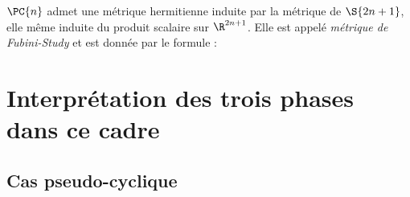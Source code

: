 \begin{proposition}
	$\PC{n}$ admet une métrique hermitienne induite par la métrique de $\S{2n+1}$, elle même induite du produit scalaire sur $\R^{2n+1}$. Elle est appelé \emph{métrique de Fubini-Study} et est donnée par le formule :
	\[\]
\end{proposition}


\section{Interprétation des trois phases dans ce cadre}

\subsection{Cas pseudo-cyclique}


